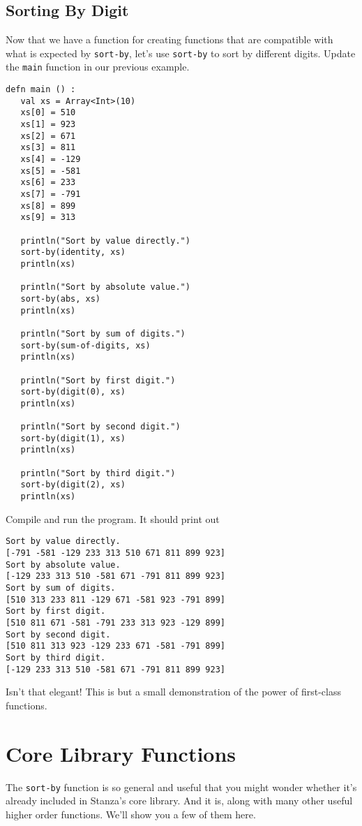 \documentclass[10pt,oneside]{book}
\begin{document}
\subsection*{Sorting By Digit}
Now that we have a function for creating functions that are compatible with what is expected by \texttt{\frenchspacing sort-by}, let's use \texttt{\frenchspacing sort-by} to sort by different digits. Update the \texttt{\frenchspacing main} function in our previous example.
\begin{lstlisting}
defn main () :
   val xs = Array<Int>(10)
   xs[0] = 510
   xs[1] = 923
   xs[2] = 671
   xs[3] = 811
   xs[4] = -129
   xs[5] = -581
   xs[6] = 233
   xs[7] = -791
   xs[8] = 899
   xs[9] = 313

   println("Sort by value directly.")
   sort-by(identity, xs)
   println(xs)

   println("Sort by absolute value.")
   sort-by(abs, xs)
   println(xs)

   println("Sort by sum of digits.")
   sort-by(sum-of-digits, xs)
   println(xs)

   println("Sort by first digit.")
   sort-by(digit(0), xs)
   println(xs)

   println("Sort by second digit.")
   sort-by(digit(1), xs)
   println(xs)

   println("Sort by third digit.")
   sort-by(digit(2), xs)
   println(xs)   
\end{lstlisting}
Compile and run the program. It should print out
\begin{lstlisting}
Sort by value directly.
[-791 -581 -129 233 313 510 671 811 899 923]
Sort by absolute value.
[-129 233 313 510 -581 671 -791 811 899 923]
Sort by sum of digits.
[510 313 233 811 -129 671 -581 923 -791 899]
Sort by first digit.
[510 811 671 -581 -791 233 313 923 -129 899]
Sort by second digit.
[510 811 313 923 -129 233 671 -581 -791 899]
Sort by third digit.
[-129 233 313 510 -581 671 -791 811 899 923]
\end{lstlisting}

Isn't that elegant! This is but a small demonstration of the power of first-class functions.  

\section{Core Library Functions}
The \texttt{\frenchspacing sort-by} function is so general and useful that you might wonder whether it's already included in Stanza's core library. And it is, along with many other useful higher order functions. We'll show you a few of them here.
\end{document}
